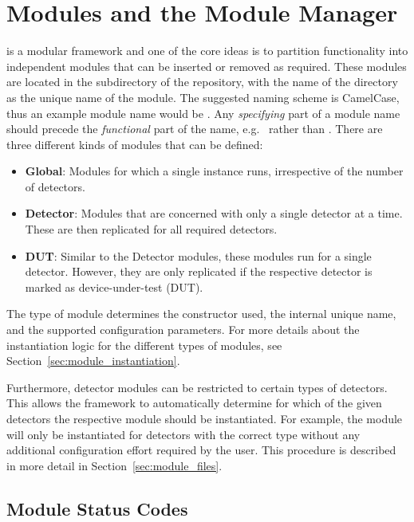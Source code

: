 \section{Modules and the Module Manager}
\label{sec:module_manager}
\corry is a modular framework and one of the core ideas is to partition functionality into independent modules that can be inserted or removed as required.
These modules are located in the subdirectory  of the repository, with the name of the directory as the unique name of the module.
The suggested naming scheme is CamelCase, thus an example module name would be .
Any \emph{specifying} part of a module name should precede the \emph{functional} part of the name, e.g.\  rather than .
There are three different kinds of modules that can be defined:
\begin{itemize}
    \item \textbf{Global}: Modules for which a single instance runs, irrespective of the number of detectors.
    \item \textbf{Detector}: Modules that are concerned with only a single detector at a time.
    These are then replicated for all required detectors.
    \item \textbf{DUT}: Similar to the Detector modules, these modules run for a single detector.
    However, they are only replicated if the respective detector is marked as device-under-test (DUT).
\end{itemize}
The type of module determines the constructor used, the internal unique name, and the supported configuration parameters.
For more details about the instantiation logic for the different types of modules, see Section~\ref{sec:module_instantiation}.

Furthermore, detector modules can be restricted to certain types of detectors.
This allows the framework to automatically determine for which of the given detectors the respective module should be instantiated.
For example, the  module will only be instantiated for detectors with the correct type  without any additional configuration effort required by the user.
This procedure is described in more detail in Section~\ref{sec:module_files}.

\subsection{Module Status Codes}

